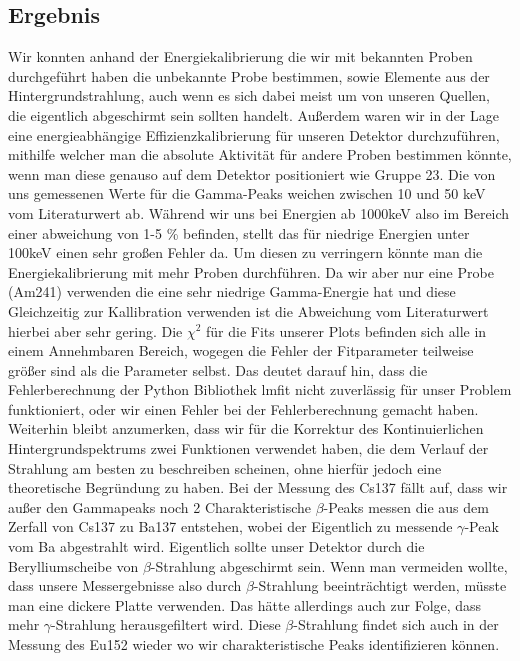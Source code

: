 \documentclass[]{article}
\begin{document}
	\subsection{Ergebnis}
	Wir konnten anhand der Energiekalibrierung die wir mit bekannten Proben durchgeführt haben die unbekannte Probe bestimmen, sowie Elemente aus der Hintergrundstrahlung, auch wenn es sich dabei meist um von unseren Quellen, die eigentlich abgeschirmt sein sollten handelt. Außerdem waren wir in der Lage eine energieabhängige Effizienzkalibrierung für unseren Detektor durchzuführen, mithilfe welcher man die absolute Aktivität für andere Proben bestimmen könnte, wenn man diese genauso auf dem Detektor positioniert wie Gruppe 23. Die von uns gemessenen Werte für die Gamma-Peaks weichen zwischen 10 und 50 keV vom Literaturwert ab. Während wir uns bei Energien ab 1000keV also im Bereich einer abweichung von 1-5 \% befinden, stellt das für niedrige Energien unter 100keV einen sehr großen Fehler da. Um diesen zu verringern könnte man die Energiekalibrierung mit mehr Proben durchführen. Da wir aber nur eine Probe (Am241) verwenden die eine sehr niedrige Gamma-Energie hat und diese Gleichzeitig zur Kallibration verwenden ist die Abweichung vom Literaturwert hierbei aber sehr gering. Die $\chi^2$ für die Fits unserer Plots befinden sich alle in einem Annehmbaren Bereich, wogegen die Fehler der Fitparameter teilweise größer sind als die Parameter selbst. Das deutet darauf hin, dass die Fehlerberechnung der Python Bibliothek lmfit nicht zuverlässig für unser Problem funktioniert, oder wir einen Fehler bei der Fehlerberechnung gemacht haben. Weiterhin bleibt anzumerken, dass wir für die Korrektur des Kontinuierlichen Hintergrundspektrums  zwei Funktionen verwendet haben, die dem Verlauf der Strahlung am besten zu beschreiben scheinen, ohne hierfür jedoch eine theoretische Begründung zu haben. Bei der Messung des Cs137 fällt auf, dass wir außer den Gammapeaks noch 2 Charakteristische $\beta$-Peaks messen die aus dem Zerfall von Cs137 zu Ba137 entstehen, wobei der Eigentlich zu messende $\gamma$-Peak vom Ba abgestrahlt wird. Eigentlich sollte unser Detektor durch die Berylliumscheibe von $\beta$-Strahlung abgeschirmt sein. Wenn man vermeiden wollte, dass unsere Messergebnisse also durch $\beta$-Strahlung beeinträchtigt werden, müsste man eine dickere Platte verwenden. Das hätte allerdings auch zur Folge, dass mehr $\gamma$-Strahlung herausgefiltert wird. Diese $\beta$-Strahlung findet sich auch in der Messung des Eu152 wieder wo wir charakteristische Peaks identifizieren können.	%
	
\end{document}

